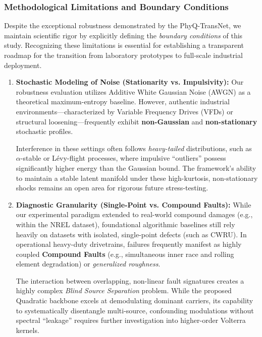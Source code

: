 \documentclass[5p,times,twocolumn]{elsarticle}
\begin{document}
\subsubsection{Methodological Limitations and Boundary Conditions}
Despite the exceptional robustness demonstrated by the PhyQ-TransNet, we maintain scientific rigor by explicitly defining the \textit{boundary conditions} of this study. Recognizing these limitations is essential for establishing a transparent roadmap for the transition from laboratory prototypes to full-scale industrial deployment.

\begin{enumerate}
    \item \textbf{Stochastic Modeling of Noise (Stationarity vs. Impulsivity):} 
    Our robustness evaluation utilizes Additive White Gaussian Noise (AWGN) as a theoretical maximum-entropy baseline. However, authentic industrial environments---characterized by Variable Frequency Drives (VFDs) or structural loosening---frequently exhibit \textbf{non-Gaussian} and \textbf{non-stationary} stochastic profiles. 
    
    Interference in these settings often follows \textit{heavy-tailed} distributions, such as $\alpha$-stable or L\'evy-flight processes, where impulsive ``outliers'' possess significantly higher energy than the Gaussian bound. The framework's ability to maintain a stable latent manifold under these high-kurtosis, non-stationary shocks remains an open area for rigorous future stress-testing.

    \item \textbf{Diagnostic Granularity (Single-Point vs. Compound Faults):} 
    While our experimental paradigm extended to real-world compound damages (e.g., within the NREL dataset), foundational algorithmic baselines still rely heavily on datasets with isolated, single-point defects (such as CWRU). In operational heavy-duty drivetrains, failures frequently manifest as highly coupled \textbf{Compound Faults} (e.g., simultaneous inner race and rolling element degradation) or \textit{generalized roughness}. 
    
    

    The interaction between overlapping, non-linear fault signatures creates a highly complex \textit{Blind Source Separation} problem. While the proposed Quadratic backbone excels at demodulating dominant carriers, its capability to systematically disentangle multi-source, confounding modulations without spectral ``leakage'' requires further investigation into higher-order Volterra kernels.


\end{enumerate}
\end{document}
